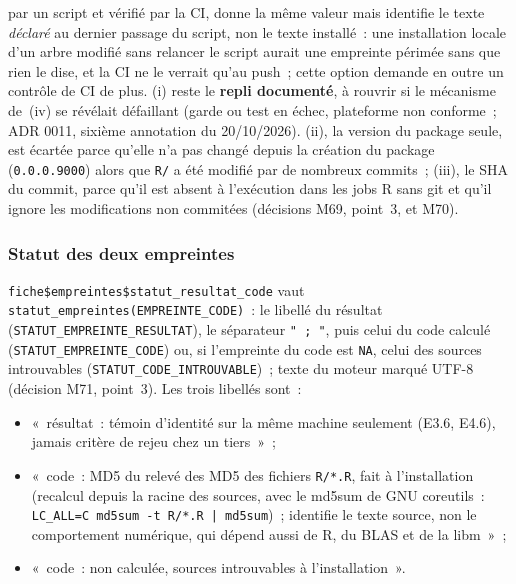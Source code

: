 \documentclass[a4paper,11pt]{article}
\newcommand{\code}[1]{\texttt{\small #1}}
\begin{document}
\begin{itemize}[leftmargin=*, itemsep=2pt]
    par un script et vérifié par la CI, donne la même valeur mais identifie
    le texte \emph{déclaré} au dernier passage du script, non le texte
    installé~: une installation locale d'un arbre modifié sans relancer le
    script aurait une empreinte périmée sans que rien le dise, et la CI ne le
    verrait qu'au push~; cette option demande en outre un contrôle de CI de
    plus.
    (i) reste le \textbf{repli documenté}, à rouvrir si le mécanisme de~(iv)
    se révélait défaillant (garde ou test en échec, plateforme non conforme~;
    ADR 0011, sixième annotation du 20/10/2026). (ii), la version du package
    seule, est écartée parce qu'elle n'a pas changé depuis la création du
    package (\code{0.0.0.9000}) alors que \code{R/} a été modifié par de
    nombreux commits~; (iii), le SHA du commit, parce qu'il est absent à
    l'exécution dans les jobs R sans git et qu'il ignore les modifications
    non commitées (décisions M69, point~3, et M70).
\end{itemize}

\subsubsection*{Statut des deux empreintes}

\code{fiche\$empreintes\$statut\_resultat\_code} vaut
\code{statut\_empreintes(EMPREINTE\_CODE)}~: le libellé du résultat
(\code{STATUT\_EMPREINTE\_RESULTAT}), le séparateur \code{" ; "}, puis celui du code calculé
(\code{STATUT\_EMPREINTE\_CODE}) ou, si l'empreinte du code est \code{NA},
celui des sources introuvables (\code{STATUT\_CODE\_INTROUVABLE})~; texte du
moteur marqué UTF-8 (décision M71, point~3). Les trois libellés sont~:

\begin{itemize}[leftmargin=*, itemsep=2pt]
  \item «~résultat~: témoin d'identité sur la même machine seulement (E3.6,
    E4.6), jamais critère de rejeu chez un tiers~»~;
  \item «~code~: MD5 du relevé des MD5 des fichiers \code{R/*.R}, fait à
    l'installation (recalcul depuis la racine des sources, avec le md5sum de
    GNU coreutils~: \code{LC\_ALL=C md5sum -t R/*.R | md5sum})~; identifie le texte source, non
    le comportement numérique, qui dépend aussi de R, du BLAS et de la
    libm~»~;
  \item «~code~: non calculée, sources introuvables à l'installation~».
\end{itemize}
\end{document}
